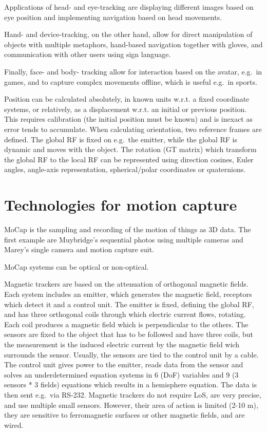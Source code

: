 \documentclass[a4paper]{article}
\begin{document}
Applications of head- and eye-tracking are displaying different images
based on eye position and implementing navigation based on head
movements.

Hand- and device-tracking, on the other hand, allow for direct
manipulation of objects with multiple metaphors, hand-based navigation
together with gloves, and communication with other users using sign
language.

Finally, face- and body- tracking allow for interaction based on the
avatar, e.g.~in games, and to capture complex movements offline, which
is useful e.g.~in sports.

Position can be calculated absolutely, in known units w.r.t. a fixed
coordinate systems, or relatively, as a displacement w.r.t. an initial
or previous position. This requires calibration (the initial position
must be known) and is inexact as error tends to accumulate. When
calculating orientation, two reference frames are defined. The global RF
is fixed on e.g.~the emitter, while the global RF is dynamic and moves
with the object. The rotation (GT matrix) which transform the global RF
to the local RF can be represented using direction cosines, Euler
angles, angle-axis representation, spherical/polar coordinates or
quaternions.


\section{Technologies for motion
capture}

MoCap is the sampling and recording of the motion of things as 3D data.
The first example are Muybridge's sequential photos using multiple
cameras and Marey's single camera and motion capture suit.

MoCap systems can be optical or non-optical.

Magnetic trackers are based on the attenuation of orthogonal magnetic
fields. Each system includes an emitter, which generates the magnetic
field, receptors which detect it and a control unit. The emitter is
fixed, defining the global RF, and has three orthogonal coils through
which electric current flows, rotating. Each coil produces a magnetic
field which is perpendicular to the others. The sensors are fixed to the
object that has to be followed and have three coils, but the measurement
is the induced electric current by the magnetic field wich surrounds the
sensor. Usually, the sensors are tied to the control unit by a cable.
The control unit gives power to the emitter, reads data from the sensor
and solves an underdetermined equation systems in 6 (DoF) variables and
9 (3 sensors * 3 fields) equations which results in a hemisphere
equation. The data is then sent e.g.~via RS-232. Magnetic trackers do
not require LoS, are very precise, and use multiple small sensors.
However, their area of action is limited (2-10 m), they are sensitive to
ferromagnetic surfaces or other magnetic fields, and are wired.
\end{document}
